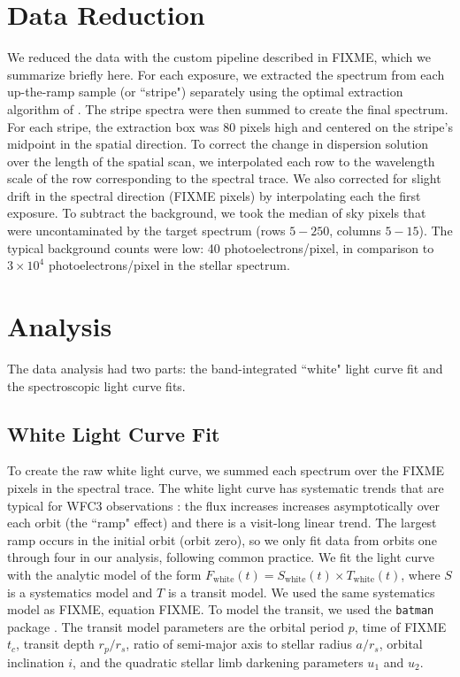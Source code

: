 \documentclass[twocolumn]{aastex61}
\begin{document}
\section{Data Reduction}
We reduced the data with the custom pipeline described in FIXME, which we summarize briefly here. For each exposure, we extracted the spectrum from each up-the-ramp sample (or ``stripe") separately using the optimal extraction algorithm of \citep{horne86}. The stripe spectra were then summed to create the final spectrum. For each stripe, the extraction box was 80 pixels high and centered on the stripe's midpoint in the spatial direction. To correct the change in dispersion solution over the length of the spatial scan, we interpolated each row to the wavelength scale of the row corresponding to the spectral trace. We also corrected for slight drift in the spectral direction (FIXME pixels) by interpolating each the first exposure.  To subtract the background, we took the median of sky pixels that were uncontaminated by the target spectrum (rows $5-250$, columns $5-15$). The typical background counts were low: 40 photoelectrons/pixel, in comparison to $3\times10^4$ photoelectrons/pixel in the stellar spectrum.

\section{Analysis}
The data analysis had two parts: the band-integrated ``white" light curve fit and the spectroscopic light curve fits.

\subsection{White Light Curve Fit}
To create the raw white light curve, we summed each spectrum over the FIXME pixels in the spectral trace.  The white light curve has systematic trends that are typical for WFC3 observations \cite{zhou17}: the flux increases increases asymptotically over each orbit (the ``ramp" effect) and there is a visit-long linear trend. The largest ramp occurs in the initial orbit (orbit zero), so we only fit data from orbits one through four in our analysis, following common practice.  We fit the light curve with the analytic model of the form $F_\mathrm{white}(t) = S_\mathrm{white}(t)\times T_\mathrm{white}(t)$, where $S$ is a systematics model and $T$ is a transit model. We used the same systematics model as FIXME, equation FIXME.  To model the transit, we used the \texttt{batman} package \citep{kreidberg15b}.  The transit model parameters are the orbital period $p$, time of FIXME $t_c$, transit depth $r_p/r_s$, ratio of semi-major axis to stellar radius $a/r_s$, orbital inclination $i$, and the quadratic stellar limb darkening parameters $u_1$ and $u_2$.
\end{document}
